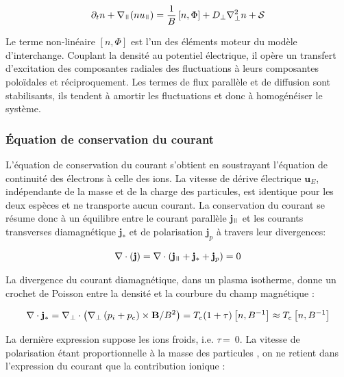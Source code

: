 \begin{refsection}
\begin{equation}
\label{2-eqContinuiteFinale}
\partial_t n + \nabla_{\para}(nu_{\para}) =
\frac{1}{B}\left[n,\Phi\right] + D_\perp\nabla^2_\perp n + \mathcal{S}
\end{equation}

Le terme non-linéaire $[n,\Phi]$ est l'un des éléments moteur du modèle
d'interchange. Couplant la densité au potentiel électrique, il opère un
transfert d'excitation des composantes radiales des fluctuations à leurs
composantes poloïdales et réciproquement. Les termes de flux parallèle et de
diffusion sont stabilisants, ils tendent à
amortir les fluctuations et donc à homogénéiser le système.

\subsubsection{Équation de conservation du courant}
L'équation de conservation du courant s'obtient en soustrayant l'équation de
continuité des électrons à celle des ions. La vitesse de dérive électrique
$\mathbf{u}_E$, indépendante de la masse et de la charge des particules,
est identique pour les deux espèces et ne transporte aucun courant. 
La conservation du courant se résume donc à un équilibre entre le courant
parallèle $\mathbf{j}_\para$ et les courants transverses diamagnétique
$\mathbf{j}_*$ et de polarisation $\mathbf{j}_p$ à travers leur
divergences:

\begin{equation}
\label{EqCourant1}
\nabla\cdot\left(\mathbf{j}\right) = 
\nabla\cdot\left(\mathbf{j}_\para+\mathbf{j}_*+\mathbf{j}_p\right)
= 0
\end{equation}

La divergence du courant diamagnétique, dans un plasma isotherme, donne un
crochet de Poisson entre la densité et la courbure du champ magnétique :

\begin{equation}
\nabla\cdot\mathbf{j}_*=
\nabla_\perp\cdot\left(\nabla_\perp\left(
p_i+p_e\right)\times\mathbf{B}/B^2\right) =
T_e(1+\tau)\left[n,B^{{-1}}\right] \approx
T_e\left[n,B^{{-1}}\right]
\end{equation}

La dernière expression suppose les ions froids, i.e. $\tau\,$=~0.
La vitesse de polarisation étant
proportionnelle à la masse des particules , on ne
retient dans l'expression du courant que la contribution ionique :


\end{refsection}
